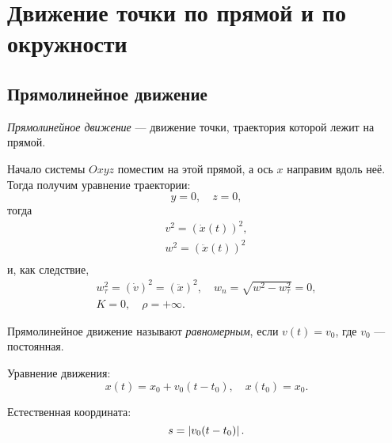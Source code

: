 \section{Движение точки по прямой и по окружности}

\subsection{Прямолинейное движение}

\begin{definition}
  \textit{Прямолинейное движение} --- движение точки, траектория которой лежит
  на прямой.
\end{definition}

Начало системы $Oxyz$ поместим на этой прямой, а ось $x$ направим вдоль неё.
Тогда получим уравнение траектории:
\begin{equation*}
  y = 0, \quad z = 0,
\end{equation*}
тогда
\begin{equation*}
  \begin{gathered}
    v^2 = (\dot{x}(t))^2, \\
    w^2 = (\ddot{x}(t))^2 \\
  \end{gathered}
\end{equation*}
и, как следствие,
\begin{equation*}
  \begin{gathered}
    w_\tau^2 = (\dot{v})^2 = (\ddot{x})^2, \quad
      w_n = \sqrt{w^2 - w_\tau^2} = 0, \\
    K = 0, \quad \rho = +\infty.
  \end{gathered}
\end{equation*}

\begin{definition}
  Прямолинейное движение называют \textit{равномерным}, если $v(t) = v_0$,
  где $v_0$ --- постоянная.

  Уравнение движения:
  \begin{equation*}
    x(t) = x_0 + v_0 (t - t_0), \quad x(t_0) = x_0.
  \end{equation*}

  Естественная координата:
  \begin{equation*}
    s = \left|v_0 (t - t_0)\right|.
  \end{equation*}
\end{definition}

